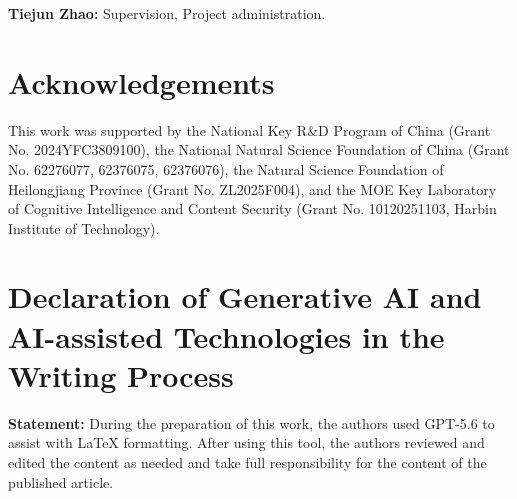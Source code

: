 \documentclass[a4paper,fleqn]{cas-dc}
\begin{document}
\textbf{Tiejun Zhao:} Supervision, Project administration.

\section*{Acknowledgements}
This work was supported by the National Key R\&D Program of China (Grant No. 2024YFC3809100), the National Natural Science Foundation of China (Grant No. 62276077, 62376075, 62376076), the Natural Science Foundation of Heilongjiang Province (Grant No. ZL2025F004), and the MOE Key Laboratory of Cognitive Intelligence and Content Security (Grant No. 10120251103, Harbin Institute of Technology).

\section*{Declaration of Generative AI and AI-assisted Technologies in the Writing Process}
\textbf{Statement:} During the preparation of this work, the authors used GPT-5.6 to assist with LaTeX formatting. After using this tool, the authors reviewed and edited the content as needed and take full responsibility for the content of the published article.

\clearpage

% 




\end{document}
